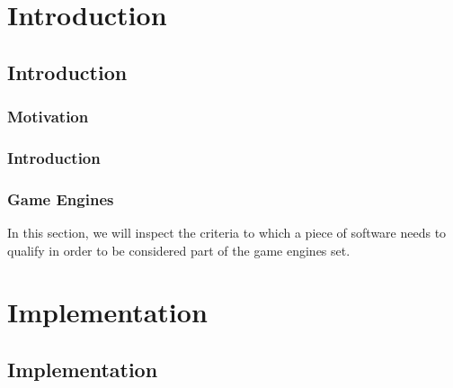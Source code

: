 \documentclass[12pt]{report}
\def\blankpage{%
      \clearpage%
      \thispagestyle{empty}%
      \addtocounter{page}{-1}%
      \null%
      \clearpage}
\begin{document}
    
    








    \blankpage
    
    \blankpage
    
    \blankpage

    \setcounter{page}{1}
    






    \blankpage
    
 




    \tableofcontents






    \part{Introduction}
      \chapter*{Introduction}
        \section*{Motivation}
          
        \section*{Introduction}
          
          
        \section*{Game Engines}
          In this section, we will inspect the criteria to which a piece of software needs to qualify in order to be considered part of the game engines set.
          

    \part{Implementation}
      \chapter*{Implementation}
        
\end{document}
